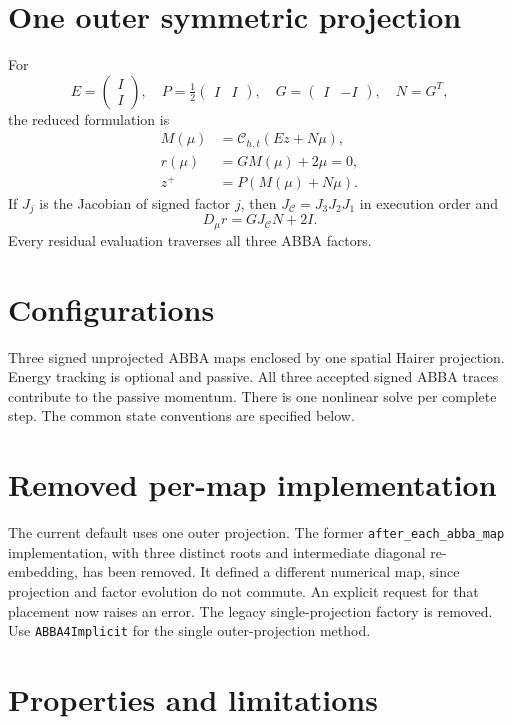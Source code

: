 \documentclass[11pt,a4paper]{article}
\begin{document}
\section{One outer symmetric projection}

For
\[
E=\begin{pmatrix}I\\I\end{pmatrix},\quad
P=\tfrac12\begin{pmatrix}I&I\end{pmatrix},\quad
G=\begin{pmatrix}I&-I\end{pmatrix},\quad N=G^T,
\]
the reduced formulation is
\begin{align}
M(\mu)&=\mathcal C_{h,t}(Ez+N\mu),\\
r(\mu)&=GM(\mu)+2\mu=0,\\
z^+&=P(M(\mu)+N\mu).
\end{align}
If $J_j$ is the Jacobian of signed factor $j$, then
$J_\mathcal C=J_3J_2J_1$ in execution order and
\[
D_\mu r=GJ_\mathcal C N+2I.
\]
Every residual evaluation traverses all three ABBA factors.

\section{Configurations}
Three signed unprojected ABBA maps enclosed by one spatial Hairer projection. Energy tracking is optional and passive.
All three accepted signed ABBA traces contribute to the passive momentum. There is one nonlinear solve per complete step.
The common state conventions are specified below.

\section{Removed per-map implementation}

The current default uses one outer projection. The former
\texttt{after\_each\_abba\_map} implementation, with three distinct roots and
intermediate diagonal re-embedding, has been removed. It defined a different
numerical map, since projection and factor evolution do not commute.
An explicit request for that placement now raises an error.
The legacy single-projection factory is removed. Use \texttt{ABBA4Implicit}
for the single outer-projection method.

\section{Properties and limitations}
\end{document}
